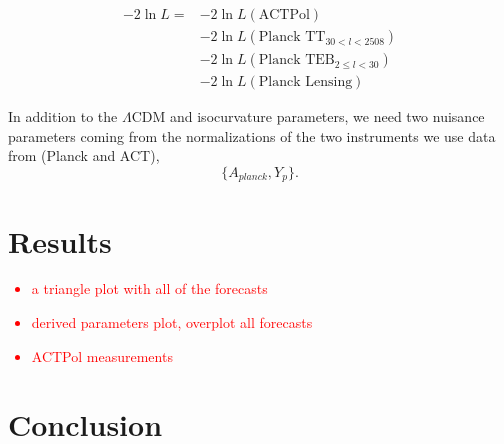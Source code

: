 \documentclass[11pt,a4paper]{emulateapj}
\newcommand\writingnote[1]{\textcolor{red}{#1}}
\begin{document}
\begin{align}
-2 \ln L = &- 2 \ln L(\text{ACTPol}) \\
&-2 \ln L(\text{Planck TT}_{30 < l < 2508}) \\ 
&-2 \ln L(\text{Planck TEB}_{2 \leq l < 30})\\ 
&-2 \ln L(\text{Planck Lensing})
\end{align}

In addition to the $\Lambda$CDM and isocurvature parameters, we need two nuisance parameters coming from the normalizations of the two instruments we use data from (Planck and ACT),
\begin{equation}
\{ A_{planck}, Y_p \}.
\end{equation}

\section{Results}

\writingnote{
    \begin{itemize}
        \item a triangle plot with all of the forecasts
        \item derived parameters plot, overplot all forecasts
        \item ACTPol measurements 
    \end{itemize}
}

\section{Conclusion}



\end{document}
